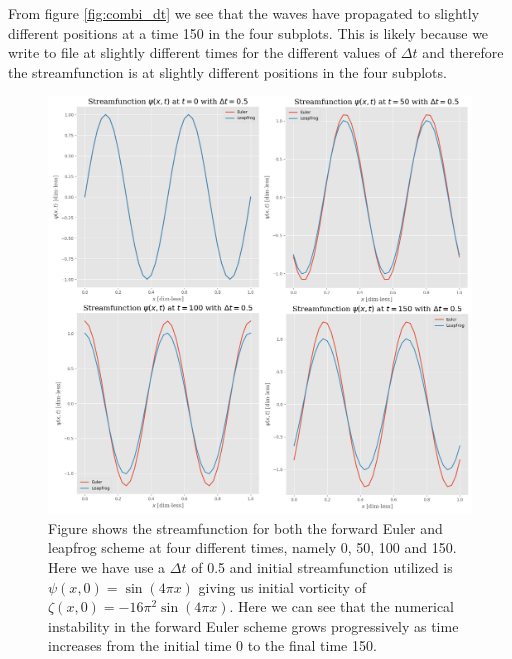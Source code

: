 \documentclass[12pt]{article}
\numberwithin{figure}{section}
\numberwithin{table}{section}
\begin{document}
\noindent From figure \ref{fig:combi_dt} we see that the waves have propagated to slightly different positions at a time 150 in the four subplots. This is likely because we write to file at slightly different times for the different values of $\Delta t$ and therefore the streamfunction is at slightly different positions in the four subplots. \\


\begin{figure}[ht]
 \centerline{\includegraphics[scale = 0.35]{psi_1d_T_combined.png}}
 \caption{Figure shows the streamfunction for both the forward Euler and leapfrog scheme at four different times, namely 0, 50, 100 and 150. Here we have use a $\Delta t$ of 0.5 and initial streamfunction utilized is $\psi(x,0) = \sin(4 \pi x)$ giving us initial vorticity of $\zeta(x,0) = -16 \pi^2 \sin(4 \pi x)$. Here we can see that the numerical instability in the forward Euler scheme grows progressively as time increases from the initial time 0 to the final time 150.}
 \label{fig:combi_T}
\end{figure}
\end{document}
